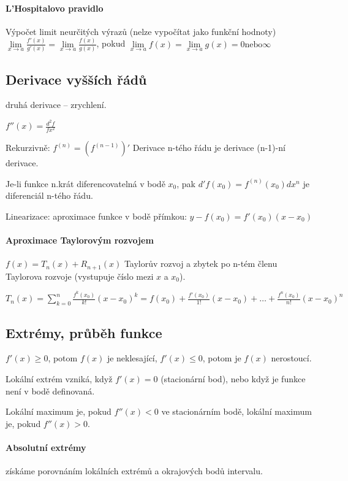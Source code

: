 \documentclass[a4paper, 11pt]{report}
\begin{document}
\paragraph{L'Hospitalovo pravidlo} Výpočet limit neurčitých výrazů (nelze vypočítat jako funkční hodnoty) $\lim\limits_{x \to a} \frac{f'(x)}{g'(x)} = \lim\limits_{x \to a} \frac{f(x)}{g(x)}$, pokud $\lim\limits_{x \to a} f(x) = \lim\limits_{x \to a} g(x) = 0 \text{nebo} \infty$

\subsection{Derivace vyšších řádů} druhá derivace -- zrychlení.

$f''(x) = \frac{d^2f}{fx^2}$

Rekurzivně: $f^{(n)} = \left( f^{(n-1)} \right)'$ Derivace n-tého řádu je derivace (n-1)-ní derivace.

Je-li funkce n.krát diferencovatelná v bodě $x_0$, pak $d' f(x_0) = f^{(n)} (x_0) dx^n$ je diferenciál n-tého řádu.

Linearizace: aproximace funkce v bodě přímkou: $y - f(x_0) = f'(x_0) (x-x_0)$

\paragraph{Aproximace Taylorovým rozvojem}

$f(x) = T_n(x) + R_{n+1}(x)$ Taylorův rozvoj a zbytek po n-tém členu Taylorova rozvoje (vystupuje číslo mezi $x$ a $x_0$).

$T_n(x) = \sum\limits_{k=0}^n \frac{f^{k}(x_0)}{k!} (x-x_0)^k = f(x_0) + \frac{f'(x_0)}{1!} (x-x_0) + \dots + \frac{f^{n}(x_0)}{n!} (x-x_0)^n$

\subsection{Extrémy, průběh funkce}

$f'(x) \geq 0$, potom $f(x)$ je neklesající, $f'(x) \leq 0$, potom je $f(x)$ nerostoucí.

Lokální extrém vzniká, když $f'(x) = 0$ (stacionární bod), nebo když je funkce není v bodě definovaná. 

Lokální maximum je, pokud $f''(x) < 0$ ve stacionárním bodě, 
lokální maximum je, pokud $f''(x) > 0$.

\paragraph{Absolutní extrémy} získáme porovnáním lokálních extrémů a okrajových bodů intervalu.
\end{document}
